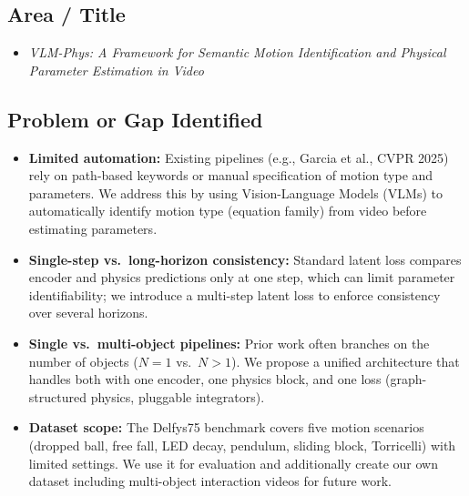 \subsection{Area / Title}
\begin{itemize}[leftmargin=1.5em]
    \item \textit{VLM-Phys: A Framework for Semantic Motion Identification and Physical Parameter Estimation in Video}
\end{itemize}

\subsection{Problem or Gap Identified}
\begin{itemize}[leftmargin=1.5em]
    \item \textbf{Limited automation:} Existing pipelines (e.g., Garcia et al., CVPR 2025) rely on path-based keywords or manual specification of motion type and parameters. We address this by using Vision-Language Models (VLMs) to automatically identify motion type (equation family) from video before estimating parameters.
    \item \textbf{Single-step vs.\ long-horizon consistency:} Standard latent loss compares encoder and physics predictions only at one step, which can limit parameter identifiability; we introduce a multi-step latent loss to enforce consistency over several horizons.
    \item \textbf{Single vs.\ multi-object pipelines:} Prior work often branches on the number of objects ($N=1$ vs.\ $N>1$). We propose a unified architecture that handles both with one encoder, one physics block, and one loss (graph-structured physics, pluggable integrators).
    \item \textbf{Dataset scope:} The Delfys75 benchmark covers five motion scenarios (dropped ball, free fall, LED decay, pendulum, sliding block, Torricelli) with limited settings. We use it for evaluation and additionally create our own dataset including multi-object interaction videos for future work.
\end{itemize}


